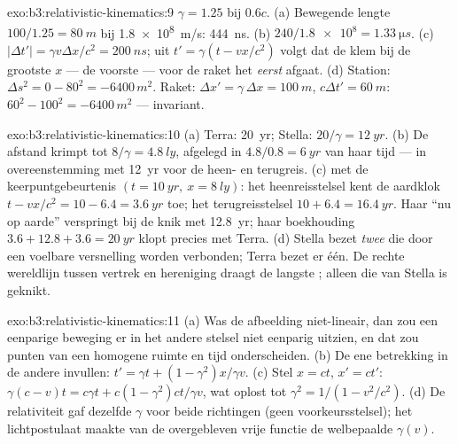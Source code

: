 \begin{solution}{exo:b3:relativistic-kinematics:9}
$\gamma = 1.25$ bij $0.6c$. (a) Bewegende lengte $100/1.25 = \qty{80}{m}$
bij \qty{1.8e8}{m/s}: \qty{444}{ns}. (b) $240/\num{1.8e8} =
\qty{1.33}{\micro s}$. (c) $|\Delta t'| = \gamma v\Delta x/c^2 =
\qty{200}{ns}$; uit $t' = \gamma(t - vx/c^2)$ volgt dat de klem bij de
grootste $x$ --- de voorste --- voor de raket het \emph{eerst} afgaat.
(d) Station: $\Delta s^2 = 0 - 80^2 = -6400\,\unit{m^2}$. Raket: $\Delta
x' = \gamma\,\Delta x = \qty{100}{m}$, $c\Delta t' = \qty{60}{m}$:
$60^2 - 100^2 = -6400\,\unit{m^2}$ --- invariant.
\end{solution}

\begin{solution}{exo:b3:relativistic-kinematics:10}
(a) Terra: \qty{20}{yr}; Stella: $20/\gamma = \qty{12}{yr}$. (b) De
afstand krimpt tot $8/\gamma = \qty{4.8}{ly}$, afgelegd in $4.8/0.8
= \qty{6}{yr}$ van haar tijd --- in overeenstemming met \qty{12}{yr} voor
de heen- en terugreis. (c)  met de keerpuntgebeurtenis
$(t =
\qty{10}{yr},\ x = \qty{8}{ly})$: het heenreisstelsel kent de
aardklok $t - vx/c^2 = 10 - 6.4 = \qty{3.6}{yr}$ toe; het
terugreisstelsel $10 +
6.4 = \qty{16.4}{yr}$. Haar ``nu op aarde''
verspringt bij de knik met \qty{12.8}{yr}; haar boekhouding $3.6 + 12.8 + 3.6 = \qty{20}{yr}$ klopt precies met Terra. (d) Stella bezet \emph{twee}
 die door een voelbare versnelling worden verbonden;
Terra bezet er één. De rechte wereldlijn tussen vertrek en hereniging
draagt de langste ; alleen die van Stella is geknikt.
\end{solution}

\begin{solution}{exo:b3:relativistic-kinematics:11}
(a) Was de afbeelding niet-lineair, dan zou een eenparige beweging er in
het andere stelsel niet eenparig uitzien, en dat zou punten van een
homogene ruimte en tijd onderscheiden. (b) De ene betrekking in de andere
invullen: $t' = \gamma t +
(1 - \gamma^2)x/\gamma v$. (c) Stel $x = ct$,
$x' = ct'$: $\gamma(c - v)t = c\gamma t + c(1 - \gamma^2)ct/\gamma v$,
wat oplost tot $\gamma^2 = 1/(1 - v^2/c^2)$. (d) De relativiteit gaf
dezelfde $\gamma$ voor beide richtingen (geen voorkeursstelsel); het
lichtpostulaat maakte van de overgebleven vrije functie de welbepaalde
$\gamma(v)$.
\end{solution}

